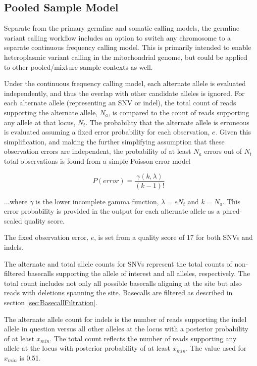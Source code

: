 \documentclass{article}
\begin{document}
\subsection{Pooled Sample Model}

Separate from the primary germline and somatic calling models, the germline variant calling workflow includes an option to switch any chromosome to a separate continuous frequency calling model. This is primarily intended to enable heteroplasmic variant calling in the mitochondrial genome, but could be applied to other pooled/mixture sample contexts as well.

Under the continuous frequency calling model, each alternate allele is evaluated independently, and thus the overlap with other candidate alleles is ignored. For each alternate allele (representing an SNV or indel), the total count of reads supporting the alternate allele, $N_a$, is compared to the count of reads supporting any allele at that locus, $N_t$. The probability that the alternate allele is erroneous is evaluated assuming a fixed error probability for each observation, $e$. Given this simplification, and making the further simplifying assumption that these observation errors are independent, the probability of at least $N_a$ errors out of $N_t$ total observations is found from a simple Poisson error model

\begin{equation*}
P(error) = \frac{\gamma(k,\lambda)}{(k-1)!}
\end{equation*}

...where $\gamma$ is the lower incomplete gamma function, $\lambda = e N_t$ and $k = N_a$. This error probability is provided in the output for each alternate allele as a phred-scaled quality score.

The fixed observation error, $e$, is set from a quality score of 17 for both SNVs and indels.

The alternate and total allele counts for SNVs represent the total counts of non-filtered basecalls supporting the allele of interest and all alleles, respectively. The total count includes not only all possible basecalls aligning at the site but also reads with deletions spanning the site. Basecalls are filtered as described in section \ref{sec:BasecallFiltration}.

The alternate allele count for indels is the number of reads supporting the indel allele in question versus all other alleles at the locus with a posterior probability of at least $x_{min}$. The total count reflects the number of reads supporting any allele at the locus with posterior probability of at least $x_{min}$. The value used for $x_{min}$ is 0.51.
\end{document}
